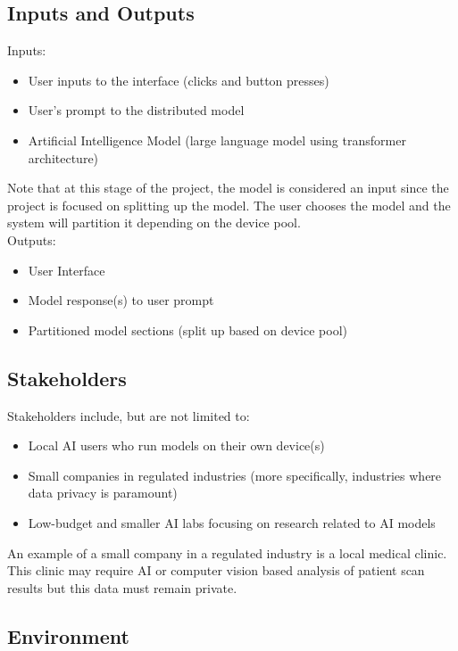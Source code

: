\documentclass{article}
\begin{document}
\subsection{Inputs and Outputs}

Inputs:

\begin{itemize}
    \item User inputs to the interface (clicks and button presses)
    \item User's prompt to the distributed model
    \item Artificial Intelligence Model (large language model using transformer architecture)
\end{itemize}

Note that at this stage of the project, the model is considered an input since the project is focused on splitting up the model. The user chooses the model and the system will partition it depending on the device pool. \\[0.5ex]

Outputs:
\begin{itemize}
    \item User Interface 
    \item Model response(s) to user prompt
    \item Partitioned model sections (split up based on device pool)
\end{itemize}

\subsection{Stakeholders}

Stakeholders include, but are not limited to:

\begin{itemize}
    \item Local AI users who run models on their own device(s)
    \item Small companies in regulated industries (more specifically, industries where data privacy is paramount)
    \item Low-budget and smaller AI labs focusing on research related to AI models
\end{itemize}

An example of a small company in a regulated industry is a local medical clinic. This clinic may require AI or computer vision based analysis of patient scan results but this data must remain private.

\subsection{Environment}
\end{document}
